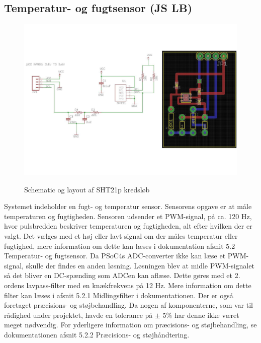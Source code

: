 \subsection{Temperatur- og fugtsensor (JS LB)}


\begin{figure}[H]
\centering
{\includegraphics[width=\textwidth]{billeder/SHT_pcb}}
\caption{Schematic og layout af SHT21p kredsl\o{}b}
\label{lab:SHT21p-kredsloeb}
\end{figure}

Systemet indeholder  en fugt- og temperatur sensor. Sensorens opgave er at måle temperaturen og fugtigheden.
Sensoren udsender et PWM-signal, på ca. 120 Hz, hvor pulsbredden beskriver temperaturen og fugtigheden,  alt efter hvilken der er valgt. Det vælges med et høj eller lavt signal om der måles temperatur eller fugtighed, mere information om dette kan læses i dokumentation afsnit 5.2 Temperatur- og fugtsensor.
Da PSoC4s ADC-converter ikke kan læse et PWM-signal, skulle der findes en anden løsning. Løsningen blev at midle PWM-signalet så det bliver en DC-spænding som ADCen kan aflæse. Dette gøres med et 2. ordens lavpass-filter med en knækfrekvens på 12 Hz. Mere information om dette filter kan læses i afsnit 5.2.1 Midlingsfilter i dokumentationen. 
Der er også foretaget præcisions- og støjbehandling. Da nogen af komponenterne, som var til rådighed under projektet, havde en tolerance på $\pm$ 5\% har denne ikke været meget nødvendig. For yderligere information om præcisions- og støjbehandling, se dokumentationen afsnit 5.2.2 Præcisions- og støjhåndtering. 